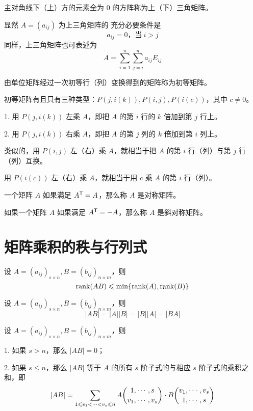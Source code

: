 \begin{definition}
	主对角线下（上）方的元素全为 $0$ 的方阵称为上（下）三角矩阵。
\end{definition}

显然 $A=(a_{ij})$ 为上三角矩阵的 充分必要条件是
\[a_{ij}=0，\text{当}\ i>j\]
同样，上三角矩阵也可表述为
\[A = \sum_{i=1}^n\sum_{j=i}^na_{ij}E_{ij}\]

\begin{definition}
	由单位矩阵经过一次初等行（列）变换得到的矩阵称为初等矩阵。
\end{definition}

初等矩阵有且只有三种类型：$P(j,i(k)),P(i,j),P(i(c))$，其中 $c\ne 0$。

1. 用 $P(j,i(k))$ 左乘 $A$，即把 $A$ 的第 $i$ 行的 $k$ 倍加到第 $j$ 行上。

2. 用 $P(j,i(k))$ 右乘 $A$，即把 $A$ 的第 $j$ 列的 $k$ 倍加到第 $i$ 列上。

类似的，用 $P(i,j)$ 左（右）乘 $A$，就相当于把 $A$ 的第 $i$ 行（列）与第 $j$ 行（列）互换。

用 $P(i(c))$ 左（右）乘 $A$，就相当于用 $c$ 乘 $A$ 的第 $i$ 行（列）。

\begin{definition}
	一个矩阵 $A$ 如果满足 ${A}^\mathsf{T} = A$，那么称 $A$ 是对称矩阵。
\end{definition}

\begin{definition}
	如果一个矩阵 $A$ 如果满足 ${A}^\mathsf{T} = -A$，那么称 $A$ 是斜对称矩阵。
\end{definition}

\section{矩阵乘积的秩与行列式}

\begin{theorem}
	设 $A = (a_{ij})_{s \times n},B = (b_{ij})_{n \times m}$，则
	\[\operatorname{rank}(AB) \leqslant \min\{\operatorname{rank}(A),\operatorname{rank}(B)\}\]
\end{theorem}

\begin{theorem}
	设 $A = (a_{ij})_{s \times n},B = (b_{ij})_{n \times m}$，则
	\[|AB| = |A||B| = |B||A| = |BA|\]
\end{theorem}

\begin{theorem}
	设 $A = (a_{ij})_{s \times n},B = (b_{ij})_{n \times m}$，则
	
	1. 如果 $s>n$，那么 $|AB| = 0$；
	
	2. 如果 $s\leqslant n$，那么  $|AB|$ 等于 $A$ 的所有 $s$ 阶子式的与相应 $s$ 阶子式的乘积之和，即
	\[|AB|=\sum_{1 \leqslant v_1<\cdots< v_s \leqslant n}A \dbinom{1,\cdots,s}{v_1,\cdots,v_s} \cdot B \dbinom{v_1,\cdots,v_s}{1,\cdots,s}\]
\end{theorem}

